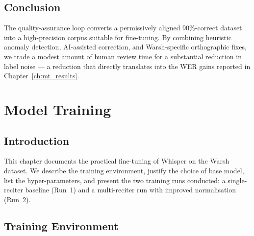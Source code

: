 \section{Conclusion}

The quality-assurance loop converts a permissively aligned 90\%-correct
dataset into a high-precision corpus suitable for fine-tuning. By
combining heuristic anomaly detection, AI-assisted correction, and
Warsh-specific orthographic fixes, we trade a modest amount of human
review time for a substantial reduction in label noise --- a reduction
that directly translates into the WER gains reported in
Chapter~\ref{ch:mt_results}.

\chapter{Model Training}
\label{ch:mt_training}

\section{Introduction}
This chapter documents the practical fine-tuning of Whisper on the
Warsh dataset. We describe the training environment, justify the choice
of base model, list the hyper-parameters, and present the two training
runs conducted: a single-reciter baseline (Run~1) and a multi-reciter
run with improved normalisation (Run~2).

\section{Training Environment}


